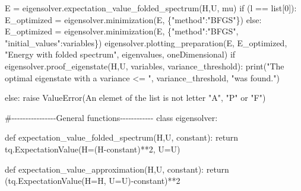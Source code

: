 \documentclass[
  letterpaper,
  DIV=11,
  numbers=noendperiod]{scrartcl}
\newenvironment{Shaded}{\begin{snugshade}}{\end{snugshade}}
\newcommand{\BuiltInTok}[1]{\textcolor[rgb]{0.00,0.23,0.31}{#1}}
\newcommand{\CommentTok}[1]{\textcolor[rgb]{0.37,0.37,0.37}{#1}}
\newcommand{\ControlFlowTok}[1]{\textcolor[rgb]{0.00,0.23,0.31}{#1}}
\newcommand{\DecValTok}[1]{\textcolor[rgb]{0.68,0.00,0.00}{#1}}
\newcommand{\KeywordTok}[1]{\textcolor[rgb]{0.00,0.23,0.31}{#1}}
\newcommand{\NormalTok}[1]{\textcolor[rgb]{0.00,0.23,0.31}{#1}}
\newcommand{\OperatorTok}[1]{\textcolor[rgb]{0.37,0.37,0.37}{#1}}
\newcommand{\PreprocessorTok}[1]{\textcolor[rgb]{0.68,0.00,0.00}{#1}}
\newcommand{\StringTok}[1]{\textcolor[rgb]{0.13,0.47,0.30}{#1}}
\begin{document}
\begin{Shaded}
\begin{Highlighting}[]
\NormalTok{                E }\OperatorTok{=}\NormalTok{ eigensolver.expectation\_value\_folded\_spectrum(H,U, mu)}
                \ControlFlowTok{if}\NormalTok{ (l }\OperatorTok{==} \BuiltInTok{list}\NormalTok{[}\DecValTok{0}\NormalTok{]):}
\NormalTok{                    E\_optimized }\OperatorTok{=}\NormalTok{ eigensolver.minimization(E, \{}\StringTok{"method"}\NormalTok{:}\StringTok{"BFGS"}\NormalTok{\})}
                \ControlFlowTok{else}\NormalTok{: }
\NormalTok{                    E\_optimized }\OperatorTok{=}\NormalTok{ eigensolver.minimization(E, \{}\StringTok{"method"}\NormalTok{:}\StringTok{"BFGS"}\NormalTok{, }\StringTok{"initial\_values"}\NormalTok{:variables\})}
\NormalTok{                eigensolver.plotting\_preparation(E, E\_optimized, }\StringTok{"Energy with folded spectrum"}\NormalTok{, eigenvalues, oneDimensional)}
                \ControlFlowTok{if}\NormalTok{ eigensolver.proof\_eigenstate(H,U, variables, variance\_threshold):}
                        \BuiltInTok{print}\NormalTok{(}\StringTok{"The optimal eigenstate with a variance \textless{}= "}\NormalTok{, variance\_threshold, }\StringTok{"was found."}\NormalTok{)}
                
            \ControlFlowTok{else}\NormalTok{:}
                \ControlFlowTok{raise} \PreprocessorTok{ValueError}\NormalTok{(}\StringTok{\textquotesingle{}An elemet of the list is not letter "A", "P" or "F"\textquotesingle{}}\NormalTok{)}

\CommentTok{\#{-}{-}{-}{-}{-}{-}{-}{-}{-}{-}{-}{-}{-}{-}{-}{-}General functions{-}{-}{-}{-}{-}{-}{-}{-}{-}{-}{-}{-}}
\KeywordTok{class}\NormalTok{ eigensolver:}
    
    \KeywordTok{def}\NormalTok{ expectation\_value\_folded\_spectrum(H,U, constant):}
        \ControlFlowTok{return}\NormalTok{ tq.ExpectationValue(H}\OperatorTok{=}\NormalTok{(H}\OperatorTok{{-}}\NormalTok{constant)}\OperatorTok{**}\DecValTok{2}\NormalTok{, U}\OperatorTok{=}\NormalTok{U)}
    
    \KeywordTok{def}\NormalTok{ expectation\_value\_approximation(H,U, constant):}
        \ControlFlowTok{return}\NormalTok{ (tq.ExpectationValue(H}\OperatorTok{=}\NormalTok{H, U}\OperatorTok{=}\NormalTok{U)}\OperatorTok{{-}}\NormalTok{constant)}\OperatorTok{**}\DecValTok{2}
    

\end{Highlighting}
\end{Shaded}
\end{document}
